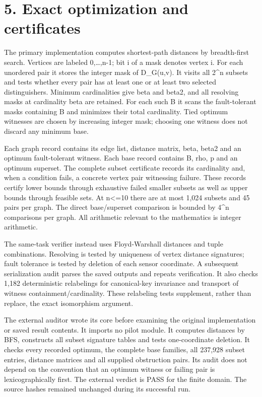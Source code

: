 \documentclass[
]{article}
\begin{document}
\section{5. Exact optimization and
certificates}\label{exact-optimization-and-certificates}

The primary implementation computes shortest-path distances by
breadth-first search. Vertices are labeled 0,\ldots,n-1; bit i of a mask
denotes vertex i. For each unordered pair it stores the integer mask of
D\_G(u,v). It visits all 2\^{}n subsets and tests whether every pair has
at least one or at least two selected distinguishers. Minimum
cardinalities give beta and beta2, and all resolving masks at
cardinality beta are retained. For each such B it scans the
fault-tolerant masks containing B and minimizes their total cardinality.
Tied optimum witnesses are chosen by increasing integer mask; choosing
one witness does not discard any minimum base.

Each graph record contains its edge list, distance matrix, beta, beta2
and an optimum fault-tolerant witness. Each base record contains B, rho,
p and an optimum superset. The complete subset certificate records its
cardinality and, when a condition fails, a concrete vertex pair
witnessing failure. These records certify lower bounds through
exhaustive failed smaller subsets as well as upper bounds through
feasible sets. At n\textless=10 there are at most 1,024 subsets and 45
pairs per graph. The direct base/superset comparison is bounded by
4\^{}n comparisons per graph. All arithmetic relevant to the mathematics
is integer arithmetic.

The same-task verifier instead uses Floyd-Warshall distances and tuple
combinations. Resolving is tested by uniqueness of vertex distance
signatures; fault tolerance is tested by deletion of each sensor
coordinate. A subsequent serialization audit parses the saved outputs
and repeats verification. It also checks 1,182 deterministic relabelings
for canonical-key invariance and transport of witness
containment/cardinality. These relabeling tests supplement, rather than
replace, the exact isomorphism argument.

The external auditor wrote its core before examining the original
implementation or saved result contents. It imports no pilot module. It
computes distances by BFS, constructs all subset signature tables and
tests one-coordinate deletion. It checks every recorded optimum, the
complete base families, all 237,928 subset entries, distance matrices
and all supplied obstruction pairs. Its audit does not depend on the
convention that an optimum witness or failing pair is lexicographically
first. The external verdict is PASS for the finite domain. The source
hashes remained unchanged during its successful run.
\end{document}
